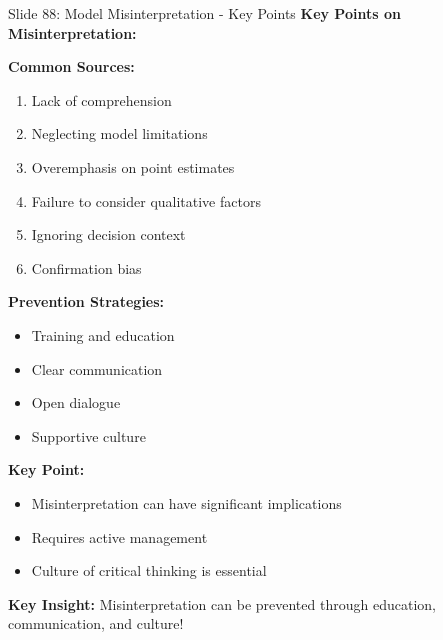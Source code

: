 \documentclass[8pt]{beamer}
\begin{document}
	\begin{frame}{Slide 88: Model Misinterpretation - Key Points}
		\fontsize{6.5}{7.5}\selectfont
		\textbf{Key Points on Misinterpretation:}
		
		\vspace{0.1cm}
		\textbf{Common Sources:}
		\begin{enumerate}
			\item Lack of comprehension
			\item Neglecting model limitations
			\item Overemphasis on point estimates
			\item Failure to consider qualitative factors
			\item Ignoring decision context
			\item Confirmation bias
		\end{enumerate}
		
		\vspace{0.1cm}
		\textbf{Prevention Strategies:}
		\begin{itemize}
			\item Training and education
			\item Clear communication
			\item Open dialogue
			\item Supportive culture
		\end{itemize}
		
		\vspace{0.1cm}
		\textbf{Key Point:}
		\begin{itemize}
			\item Misinterpretation can have significant implications
			\item Requires active management
			\item Culture of critical thinking is essential
		\end{itemize}
		
		\textcolor{myblue}{\textbf{Key Insight:}} Misinterpretation can be prevented through \textcolor{myblue}{education, communication, and culture}!
	\end{frame}
	
\end{document}
